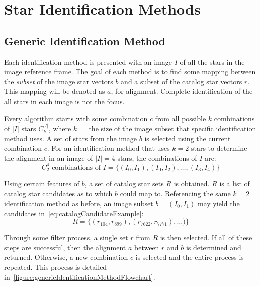\section{Star Identification Methods}\label{sec:starIdentificationMethods}

\subsection{Generic Identification Method}\label{subsec:genericIdentificationMethod}
Each identification method is presented with an image $I$ of all the stars in the image reference frame.
The goal of each method is to find some mapping between the \textit{subset} of the image star vectors $b$ and a subset
of the catalog star vectors $r$.
This mapping will be denoted as $a$, for alignment.
Complete identification of the all stars in each image is not the focus.

Every algorithm starts with some combination $c$ from all possible $k$ combinations of $|I|$ stars $C_k^{|I|}$, where
$k = $ the size of the image subset that specific identification method uses.
A set of stars from the image $b$ is selected using the current combination $c$.
For an identification method that uses $k=2$ stars to determine the alignment in an image of $|I|=4$ stars, the
combinations of $I$ are:
\begin{equation}
    C_2^4 \text{ combinations of } I = \{(I_0, I_1), (I_0, I_2), \ldots, (I_3, I_4)\}
\end{equation}

Using certain features of $b$, a set of catalog star sets $R$ is obtained.
$R$ is a list of catalog star candidates as to which $b$ could map to.
Referencing the same $k=2$ identification method as before, an image subset $b = (I_0, I_1)$ may yield the candidates
in~\autoref{eq:catalogCandidateExample}:
\begin{equation}
    \label{eq:catalogCandidateExample}
    R = \{ (r_{104}, r_{899}), (r_{7622}, r_{7771}), \ldots) \}
\end{equation}

Through some filter process, a single set $r$ from $R$ is then selected.
If all of these steps are successful, then the alignment $a$ between $r$ and $b$ is determined and returned.
Otherwise, a new combination $c$ is selected and the entire process is repeated.
This process is detailed in~\autoref{figure:genericIdentificationMethodFlowchart}.

\begin{figure}
\end{figure}

